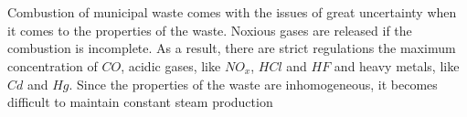 \chapter*{\englishproblemname}
%
Combustion of municipal  waste comes with the issues of great uncertainty when it comes to the properties of the waste. Noxious gases are released if the combustion is incomplete. As a result, there are strict regulations the maximum concentration of $CO$, acidic gases, like $NO_x$, $HCl$ and $HF$ and heavy metals, like $Cd$ and $Hg$. Since the properties of the waste are inhomogeneous, it becomes difficult to maintain constant steam production


\clearpage
